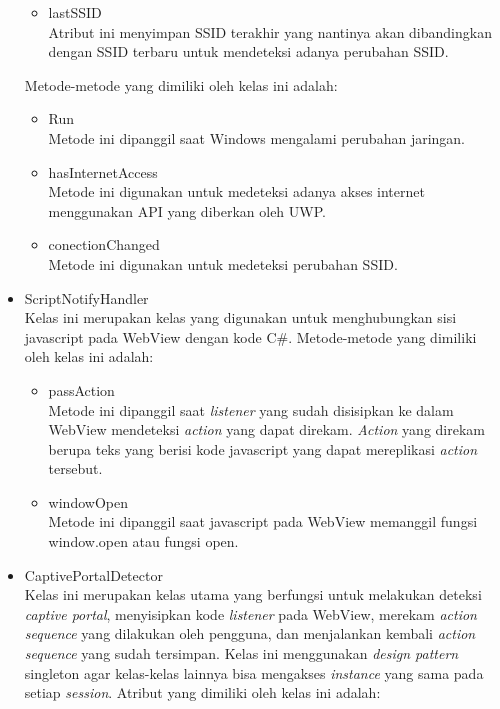 \begin{itemize}
{        \begin{itemize}
            \item{lastSSID\\Atribut ini menyimpan SSID terakhir yang nantinya akan dibandingkan dengan SSID terbaru untuk mendeteksi adanya perubahan SSID.}
        \end{itemize}
        Metode-metode yang dimiliki oleh kelas ini adalah:
        \begin{itemize}
            \item{Run\\Metode ini dipanggil saat Windows mengalami perubahan jaringan.}
            \item{hasInternetAccess\\Metode ini digunakan untuk medeteksi adanya akses internet menggunakan API yang diberkan oleh UWP.}
            \item{conectionChanged\\Metode ini digunakan untuk medeteksi perubahan SSID.}
        \end{itemize}
    }
    \item{
        ScriptNotifyHandler\\Kelas ini merupakan kelas yang digunakan untuk menghubungkan sisi javascript pada WebView dengan kode C\#. Metode-metode yang dimiliki oleh kelas ini adalah:
        \begin{itemize}
            \item{passAction\\Metode ini dipanggil saat \textit{listener} yang sudah disisipkan ke dalam WebView mendeteksi \textit{action} yang dapat direkam. \textit{Action} yang direkam berupa teks yang berisi kode javascript yang dapat mereplikasi \textit{action} tersebut.}
            \item{windowOpen\\Metode ini dipanggil saat javascript pada WebView memanggil fungsi window.open atau fungsi open.}
        \end{itemize}
    }
    \item{
        CaptivePortalDetector\\Kelas ini merupakan kelas utama yang berfungsi untuk melakukan deteksi \textit{captive portal}, menyisipkan kode \textit{listener} pada WebView, merekam \textit{action sequence} yang dilakukan oleh pengguna, dan menjalankan kembali \textit{action sequence} yang sudah tersimpan. Kelas ini menggunakan \textit{design pattern} singleton agar kelas-kelas lainnya bisa mengakses \textit{instance} yang sama pada setiap \textit{session}. Atribut yang dimiliki oleh kelas ini adalah:
}
\end{itemize}
